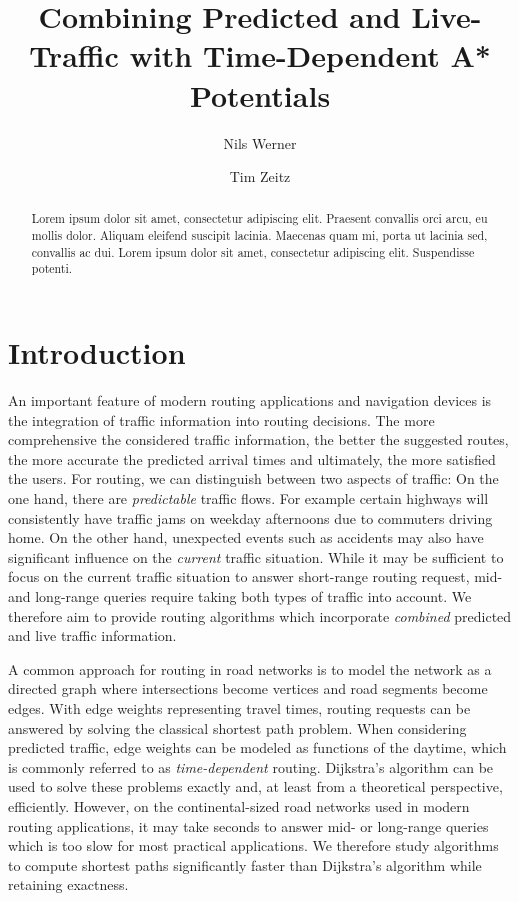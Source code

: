 \documentclass[a4paper,UKenglish,cleveref, autoref, thm-restate]{lipics-v2021}
\title{Combining Predicted and Live-Traffic with Time-Dependent A* Potentials} %
\author{Nils Werner}{Karlsruhe Institute of Technology, Germany}{}{}{}
\author{Tim Zeitz}{Karlsruhe Institute of Technology, Germany}{tim.zeitz@kit.edu}{https://orcid.org/0000-0003-4746-3582}{}
\begin{document}
\maketitle

\begin{abstract}
Lorem ipsum dolor sit amet, consectetur adipiscing elit. Praesent convallis orci arcu, eu mollis dolor. Aliquam eleifend suscipit lacinia. Maecenas quam mi, porta ut lacinia sed, convallis ac dui. Lorem ipsum dolor sit amet, consectetur adipiscing elit. Suspendisse potenti. 
\end{abstract}

\newpage

\section{Introduction}

An important feature of modern routing applications and navigation devices is the integration of traffic information into routing decisions.
The more comprehensive the considered traffic information, the better the suggested routes, the more accurate the predicted arrival times and ultimately, the more satisfied the users.
For routing, we can distinguish between two aspects of traffic:
On the one hand, there are \emph{predictable} traffic flows.
For example certain highways will consistently have traffic jams on weekday afternoons due to commuters driving home.
On the other hand, unexpected events such as accidents may also have significant influence on the \emph{current} traffic situation.
While it may be sufficient to focus on the current traffic situation to answer short-range routing request, mid- and long-range queries require taking both types of traffic into account.
We therefore aim to provide routing algorithms which incorporate \emph{combined} predicted and live traffic information.

A common approach for routing in road networks is to model the network as a directed graph where intersections become vertices and road segments become edges.
With edge weights representing travel times, routing requests can be answered by solving the classical shortest path problem.
When considering predicted traffic, edge weights can be modeled as functions of the daytime, which is commonly referred to as \emph{time-dependent} routing.
Dijkstra's algorithm can be used to solve these problems exactly and, at least from a theoretical perspective, efficiently.
However, on the continental-sized road networks used in modern routing applications, it may take seconds to answer mid- or long-range queries which is too slow for most practical applications.
We therefore study algorithms to compute shortest paths significantly faster than Dijkstra's algorithm while retaining exactness.
\end{document}
